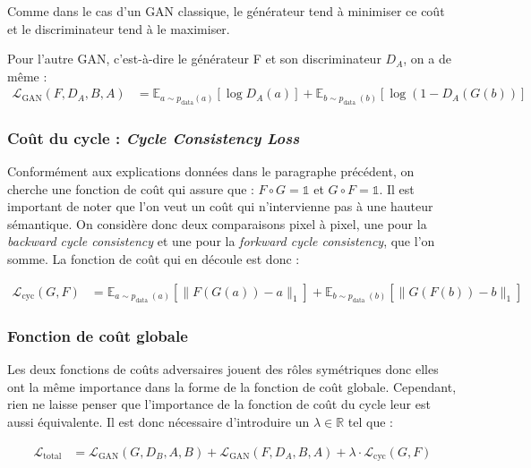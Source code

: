 Comme dans le cas d'un GAN classique, le générateur tend à minimiser ce coût et le discriminateur tend à le maximiser.

Pour l'autre GAN, c'est-à-dire le générateur F et son discriminateur $D_A$, on a de même : $$\begin{aligned}
\mathcal{L}_{\mathrm{GAN}}\left(F, D_{A}, B, A\right) &=\mathbb{E}_{a \sim p_{\mathrm{data}}(a)}\left[\log D_{A}(a)\right] +\mathbb{E}_{b \sim p_{\text {data }}(b)}\left[\log \left(1-D_{A}(G(b))\right]\right.
\end{aligned}$$

\subsubsection{Coût du cycle : \textit{Cycle Consistency Loss}}

Conformément aux explications données dans le paragraphe précédent, on cherche une fonction de coût qui assure que : $ F \circ G = \mathbb{1} $ et $ G \circ F = \mathbb{1} $. Il est important de noter que l'on veut un coût qui n'intervienne pas à une hauteur sémantique. On considère donc deux comparaisons pixel à pixel, une pour la \textit{backward cycle consistency} et une pour la \textit{forkward cycle consistency}, que l'on somme. La fonction de coût qui en découle est donc :

$$\begin{aligned}
\mathcal{L}_{\mathrm{cyc}}(G, F) &=\mathbb{E}_{a \sim p_{\text {data }}(a)}\left[\|F(G(a))-a\|_{1}\right] +\mathbb{E}_{b \sim p_{\text {data }}(b)}\left[\|G(F(b))-b\|_{1}\right]
\end{aligned}$$

\subsubsection{Fonction de coût globale}

Les deux fonctions de coûts adversaires jouent des rôles symétriques donc elles ont la même importance dans la forme de la fonction de coût globale. Cependant, rien ne laisse penser que l'importance de la fonction de coût du cycle leur est aussi équivalente. Il est donc nécessaire d'introduire un $\lambda \in \mathbb{R}$ tel que :

$$\begin{aligned}
\mathcal{L}_{\text{total}} &=\mathcal{L}_{\mathrm{GAN}}\left(G, D_{B}, A, B\right) +\mathcal{L}_{\mathrm{GAN}}\left(F, D_{A}, B, A\right) +\lambda \cdot \mathcal{L}_{\mathrm{cyc}}(G, F)
\end{aligned}$$

